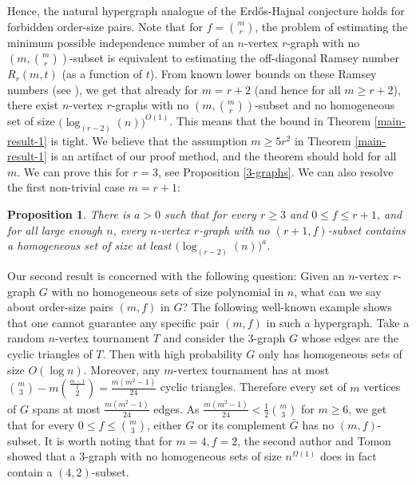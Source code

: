 \documentclass[11pt]{article}
\theoremstyle{plain}
\newtheorem{proposition}[theorem]{Proposition}
\begin{document}
Hence, the natural hypergraph analogue of the Erd\H{o}s-Hajnal conjecture holds for forbidden order-size pairs. 
Note that for $f = \binom{m}{r}$, the problem of estimating the minimum possible independence number of an $n$-vertex $r$-graph with no $(m,\binom{m}{r})$-subset is equivalent to estimating the off-diagonal Ramsey number $R_r(m,t)$ (as a function of $t$). From known lower bounds on these Ramsey numbers (see \cite{MS_steppingup,MS_small_r}), we get that already for $m = r+2$ (and hence for all $m \geq r+2$), there exist $n$-vertex $r$-graphs with no 
$(m,\binom{m}{r})$-subset and no homogeneous set of size $\big(\log_{(r-2)}(n) \big)^{O(1)}$. This means that the bound in Theorem \ref{main-result-1} is tight. We believe that the assumption $m \geq 5r^2$ in Theorem \ref{main-result-1} is an artifact of our proof method, and the theorem should hold for all $m$. We can prove this for $r=3$, see Proposition \ref{3-graphs}. We can also resolve the first non-trivial case $m=r+1$:
\begin{proposition}\label{thm:m=r+1}
    There is $a > 0$ such that for every $r \geq 3$ and $0 \leq f \leq r+1$, and for all large enough $n$, every $n$-vertex $r$-graph with no $(r+1,f)$-subset contains a homogeneous set of size at least 
    $\big(\log_{(r-2)}(n) \big)^{a}$. 
\end{proposition}


Our second result is concerned with the following question: Given an $n$-vertex $r$-graph $G$ with no homogeneous sets of size polynomial in $n$, 
what can we say about order-size pairs $(m,f)$ in $G$? The following well-known example shows that one cannot guarantee any specific pair $(m,f)$ in such a hypergraph. Take a random $n$-vertex tournament $T$ and consider the $3$-graph $G$ whose edges are the cyclic triangles of $T$. Then 
with high probability $G$ only has homogeneous sets of size $O(\log n)$. Moreover, any $m$-vertex tournament has at most $\binom{m}{3} - m\binom{\frac{m-1}{2}}{2} = \frac{m(m^2-1)}{24}$ cyclic triangles.
Therefore every set of $m$ vertices of $G$ spans at most $\frac{m(m^2-1)}{24}$ edges. 
As $\frac{m(m^2-1)}{24} < \frac{1}{2}\binom{m}{3}$ for $m \geq 6$, we get that for every $0 \leq f \leq \binom{m}{3}$, either $G$ or its complement $\bar{G}$ has no $(m,f)$-subset. It is worth noting that for $m=4,f=2$, the second author and Tomon \cite{GT} showed that a $3$-graph with no homogeneous sets of size $n^{\Omega(1)}$ does in fact contain a $(4,2)$-subset. 
\end{document}
